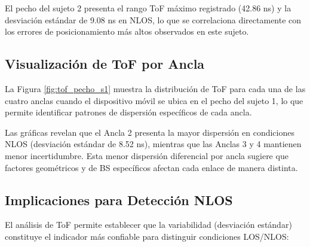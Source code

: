 El pecho del sujeto 2 presenta el rango ToF máximo registrado (42.86 ns) y la desviación estándar de 9.08 ns en NLOS, lo que se correlaciona directamente con los errores de posicionamiento más altos observados en este sujeto.

\subsection{Visualización de ToF por Ancla}

La Figura \ref{fig:tof_pecho_s1} muestra la distribución de ToF para cada una de las cuatro anclas cuando el dispositivo móvil se ubica en el pecho del sujeto 1, lo que permite identificar patrones de dispersión específicos de cada ancla.

Las gráficas revelan que el Ancla 2 presenta la mayor dispersión en condiciones NLOS (desviación estándar de 8.52 ns), mientras que las Anclas 3 y 4 mantienen menor incertidumbre. Esta menor dispersión diferencial por ancla sugiere que factores geométricos y de BS específicos afectan cada enlace de manera distinta.

\subsection{Implicaciones para Detección NLOS}

El análisis de ToF permite establecer que la variabilidad (desviación estándar) constituye el indicador más confiable para distinguir condiciones LOS/NLOS:

